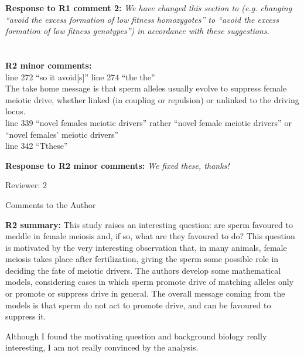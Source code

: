 \documentclass[12pt,letterpaper]{article}
\begin{document}
{\bf{Response to R1 comment 2:}} \emph{We have changed this section to (e.g. changing ``avoid the excess formation of low fitness homozygotes'' to ``avoid the excess formation of low fitness genotypes'') in accordance with these suggestions.}
\\
\\
\\
{\bf{R2 minor comments:}}
\\ line 272 ``so it avoid[s]'' line 274 ``the the''
\\
The take home message is that sperm alleles usually evolve to suppress female meiotic drive, whether linked (in coupling or repulsion) or unlinked to the driving locus.
\\
line 339 ``novel females meiotic drivers'' rather ``novel female meiotic drivers'' or ``novel females' meiotic drivers''
\\
line 342 ``Tthese''

{\bf{Response to R2 minor comments:}} \emph{We fixed these, thanks!}

\newpage{}

Reviewer: 2

Comments to the Author

{\bf{R2 summary:}}
This study raises an interesting question: are sperm favoured to meddle in female meiosis and, if so, what are they favoured to do? This question is motivated by the very interesting observation that, in many animals, female meiosis takes place after fertilization, giving the sperm some possible role in deciding the fate of meiotic drivers. The authors develop some mathematical models, considering cases in which sperm promote drive of matching alleles only or promote or suppress drive in general. The overall message coming from the models is that sperm do not act to promote drive, and can be favoured to suppress it.

Although I found the motivating question and background biology really interesting, I am not really convinced by the analysis.
\end{document}

